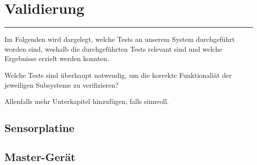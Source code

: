 \chapter{Validierung}
\label{chap:validierung}

{%
    \small
    \startcontents[chapters]
}

\plainbreak{1}

Im Folgenden  wird dargelegt,  welche Tests  an unserem  System durchgef\"uhrt
worden  sind, weshalb  die  durchgef\"uhrten Tests  relevant  sind und  welche
Ergebnisse erzielt werden konnten.

\anweisung  Welche   Tests  sind   \"uberhaupt  notwendig,  um   die  korrekte
Funktionali\"at der jeweiligen Subsysteme zu verifizieren?

\anweisung Allenfalls mehr Unterkapitel hinzuf\"ugen, falls sinnvoll.

\section{Sensorplatine}
\label{sec:validierung:sensorplatine}


\section{Master-Ger\"at}
\label{sec:validierung:master}
